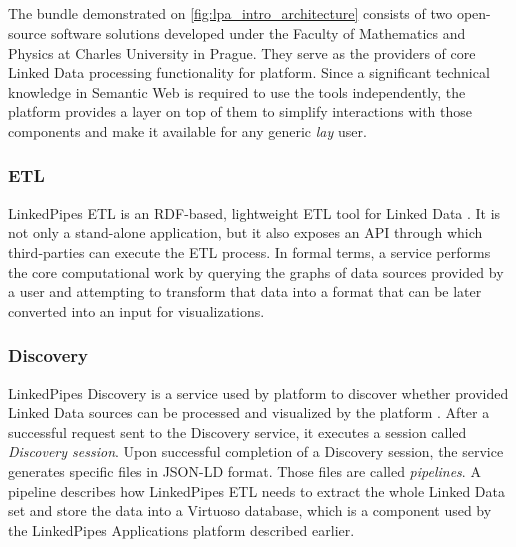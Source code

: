 \subsection{\lps{}} 
\label{ssssec:linkedpipes_services}

The \lps{} bundle demonstrated on \autoref{fig:lpa_intro_architecture} consists of two open-source software solutions developed under the Faculty of Mathematics and Physics at Charles University in Prague. They serve as the providers of core Linked Data processing functionality for \lpa{} platform. Since a significant technical knowledge in Semantic Web is required to use the tools independently, the \lpa{} platform provides a layer on top of them to simplify interactions with those components and make it available for any generic \textit{lay} user. 

\subsubsection{ETL} 

LinkedPipes ETL is an RDF-based, lightweight \acrfull{ETL} tool for Linked Data \cite{etl}. It is not only a stand-alone application, but it also exposes an \acrshort{API} through which third-parties can execute the ETL process. In formal terms, a service performs the core computational work by querying the graphs of data sources provided by a user and attempting to transform that data into a format that can be later converted into an input for visualizations. 

\subsubsection{Discovery} 

LinkedPipes Discovery is a service used by \lpa{} platform to discover whether provided Linked Data sources can be processed and visualized by the platform \cite{discovery}. After a successful request sent to the Discovery service, it executes a session called \textit{Discovery session}. Upon successful completion of a Discovery session, the service generates specific files in JSON-LD format. Those files are called \textit{pipelines}. A pipeline describes how LinkedPipes ETL needs to extract the whole Linked Data set and store the data into a Virtuoso database, which is a component used by the LinkedPipes Applications platform described earlier. 